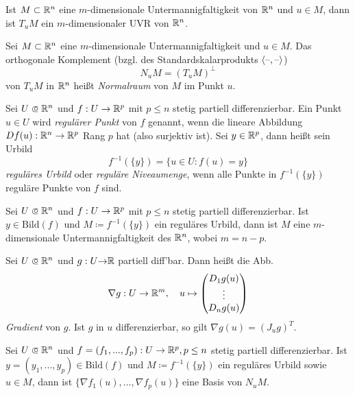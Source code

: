 \documentclass{cheat-sheet}
\begin{document}
\begin{satz}
  Ist $M \subset \mathbb{R}^n$ eine $m$-dimensionale Untermannigfaltigkeit von $\mathbb{R}^n$ und $u \in M$, dann ist $T_u M$ ein $m$-dimensionaler UVR von $\mathbb{R}^n$.
\end{satz}

\begin{defn}
  Sei $M \subset \mathbb{R}^n$ eine $m$-dimensionale Untermannigfaltigkeit und $u \in M$. Das orthogonale Komplement (bzgl. des Standardskalarprodukts $\langle \text{--}, \text{--} \rangle$)
  \[ N_u M = (T_u M)^\perp \]
  von $T_u M$ in $\mathbb{R}^n$ heißt \emph{Normalraum} von $M$ im Punkt $u$.
\end{defn}

\begin{defn}
  Sei $U \opn \R^n$ und $f : U \to \mathbb{R}^p$ mit $p \le n$ stetig partiell differenzierbar. Ein Punkt $u \in U$ wird \emph{regulärer Punkt} von $f$ genannt, wenn die lineare Abbildung $D f(u) : \mathbb{R}^n \to \mathbb{R}^p$ Rang $p$ hat (also surjektiv ist). Sei $y \in \mathbb{R}^p$, dann heißt sein Urbild
  \[ f^{-1}(\{y\}) = \{ u \in U : f(u) = y \} \]
  \emph{reguläres Urbild} oder \emph{reguläre Niveaumenge}, wenn alle Punkte in $f^{-1}(\{ y \})$ reguläre Punkte von $f$ sind.
\end{defn}

\begin{defn}
  Sei $U \opn \R^n$ und $f : U \to \mathbb{R}^p$ mit $p \le n$ stetig partiell differenzierbar. Ist $y \in \mathrm{Bild}(f)$ und $M \coloneqq f^{-1}(\{ y \})$ ein reguläres Urbild, dann ist $M$ eine $m$-dimensionale Untermannigfaltigkeit des $\mathbb{R}^n$, wobei $m = n - p$.
\end{defn}

\begin{defn}
  Sei $U \opn \R^n$ und $g : U {\to} \mathbb{R}$ partiell diff'bar. Dann heißt die Abb.
  \[ \nabla g : U \to \mathbb{R}^m,\quad u \mapsto \begin{pmatrix} D_1 g(u) \\ \vdots \\ D_n g(u) \end{pmatrix} \]
  \emph{Gradient} von $g$. Ist $g$ in $u$ differenzierbar, so gilt $\nabla g(u) = (J_u g)^T$.
\end{defn}

\begin{satz}
  Sei $U \opn \R^n$ und $f = (f_1, ..., f_p) : U \to \mathbb{R}^p, p \le n$ stetig partiell differenzierbar. Ist $y = (y_1, ..., y_p) \in \mathrm{Bild}(f)$ und $M \coloneqq f^{-1}(\{ y \})$ ein reguläres Urbild sowie $u \in M$, dann ist $\{ \nabla f_1(u), ..., \nabla f_p(u) \}$ eine Basis von $N_u M$.
\end{satz}
\end{document}
